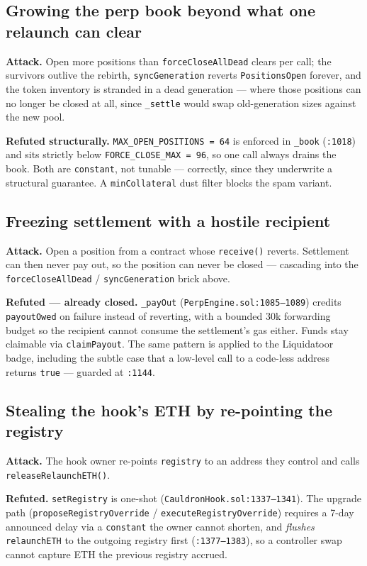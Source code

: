 \documentclass[11pt,a4paper]{article}
\newcommand{\code}[1]{\texttt{\small #1}}
\newcommand{\fileref}[1]{\texttt{\scriptsize #1}}
\begin{document}
\subsection*{Growing the perp book beyond what one relaunch can clear}
\textbf{Attack.} Open more positions than \code{forceCloseAllDead} clears per call;
the survivors outlive the rebirth, \code{syncGeneration} reverts
\code{PositionsOpen} forever, and the token inventory is stranded in a dead
generation --- where those positions can no longer be closed at all, since
\code{\_settle} would swap old-generation sizes against the new pool.

\textbf{Refuted structurally.} \code{MAX\_OPEN\_POSITIONS = 64} is enforced in
\code{\_book} (\fileref{:1018}) and sits strictly below
\code{FORCE\_CLOSE\_MAX = 96}, so one call always drains the book. Both are
\code{constant}, not tunable --- correctly, since they underwrite a structural
guarantee. A \code{minCollateral} dust filter blocks the spam variant.

\subsection*{Freezing settlement with a hostile recipient}
\textbf{Attack.} Open a position from a contract whose \code{receive()} reverts.
Settlement can then never pay out, so the position can never be closed ---
cascading into the \code{forceCloseAllDead} / \code{syncGeneration} brick above.

\textbf{Refuted --- already closed.} \code{\_payOut}
(\fileref{PerpEngine.sol:1085--1089}) credits \code{payoutOwed} on failure instead
of reverting, with a bounded 30k forwarding budget so the recipient cannot consume
the settlement's gas either. Funds stay claimable via \code{claimPayout}. The same
pattern is applied to the Liquidatoor badge, including the subtle case that a
low-level call to a code-less address returns \code{true} --- guarded at
\fileref{:1144}.

\subsection*{Stealing the hook's ETH by re-pointing the registry}
\textbf{Attack.} The hook owner re-points \code{registry} to an address they
control and calls \code{releaseRelaunchETH()}.

\textbf{Refuted.} \code{setRegistry} is one-shot
(\fileref{CauldronHook.sol:1337--1341}). The upgrade path
(\code{proposeRegistryOverride} / \code{executeRegistryOverride}) requires a 7-day
announced delay via a \code{constant} the owner cannot shorten, and \emph{flushes}
\code{relaunchETH} to the outgoing registry first (\fileref{:1377--1383}), so a
controller swap cannot capture ETH the previous registry accrued.
\end{document}
